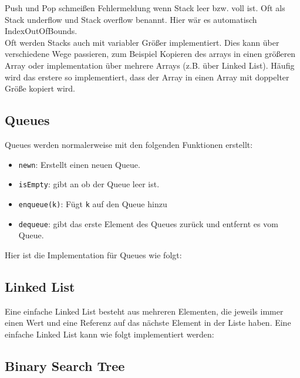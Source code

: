 \documentclass[ngerman,
color=3b,
load_common, %
boxarc,
main,
tikz,
border=3mm
]{article}
\begin{document}
Push und Pop schmeißen Fehlermeldung wenn Stack leer bzw. voll ist. Oft als Stack underflow und Stack overflow benannt. Hier wär es automatisch IndexOutOfBounds.\\ Oft werden Stacks auch mit variabler Größer implementiert. Dies kann über verschiedene Wege passieren, zum Beispiel Kopieren des arrays in einen größeren Array oder implementation über mehrere Arrays (z.B. über Linked List). Häufig wird das erstere so implementiert, dass der Array in einen Array mit doppelter Größe kopiert wird.

\newpage
\subsection{Queues}
Queues werden normalerweise mit den folgenden Funktionen erstellt:
\begin{itemize}
    \item \texttt{new{n}}: Erstellt einen neuen Queue.
    \item \texttt{isEmpty}: gibt an ob der Queue leer ist.
    \item \texttt{enqueue(k)}: Fügt \texttt{k} auf den Queue hinzu
    \item \texttt{dequeue}: gibt das erste Element des Queues zurück und entfernt es vom Queue.
\end{itemize}
Hier ist die Implementation für Queues wie folgt:


\newpage
\subsection{Linked List}
Eine einfache Linked List besteht aus mehreren Elementen, die jeweils immer einen Wert und eine Referenz auf das nächste Element in der Liste haben. Eine einfache Linked List kann wie folgt implementiert werden:





\newpage
\subsection{Binary Search Tree}


\newpage

\newpage



\end{document}
